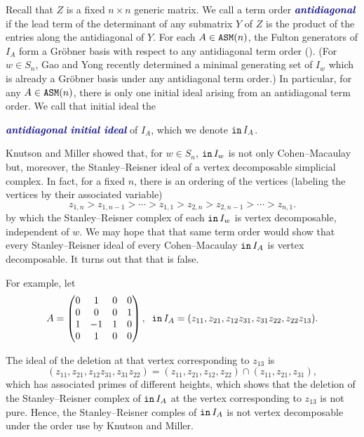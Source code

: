 \documentclass[12 pt]{amsart}
\DeclareMathOperator{\init}{{\tt in}}
\DeclareMathOperator{\asm}{\tt ASM}
\theoremstyle{plain}
\newenvironment{example}
  {\pushQED{\qed}\renewcommand{\qedsymbol}{$\diamondsuit$}\examplex}
  {\popQED\endexamplex}
\theoremstyle{definition}
\theoremstyle{remark}
\newcommand{\newword}[1]{\textcolor{darkblue}{\textbf{\emph{#1}}}}
\begin{document}
Recall that $Z$ is a fixed $n \times n$ generic matrix.  We call a term order \newword{antidiagonal} if the lead term of the determinant of any submatrix $Y$ of $Z$ is the product of the entries along the antidiagonal of $Y$.  For each $A \in \asm(n)$, the Fulton generators of $I_A$ form a Gr\"obner basis with respect to any antidiagonal term order (\cite{KM05, Knu, Wei17}).  (For $w \in S_n$, Gao and Yong \cite{GY24} recently determined a minimal generating set of $I_w$ which is already a Gr\"obner basis under any antidiagonal term order.)  In particular, for any $A \in \asm(n)$, there is only one initial ideal arising from an antidiagonal term order.  We call that initial ideal the {\newword{antidiagonal initial ideal} of $I_A$, which we denote $\init I_A$.  





Knutson and Miller \cite{KM05} showed that, for $w \in S_n$, $\init I_w$ is not only Cohen--Macaulay but, moreover, the Stanley--Reisner ideal of a vertex decomposable simplicial complex.  In fact, for a fixed $n$, there is an ordering of the vertices (labeling the vertices by their associated variable)
\[
    z_{1,n} > z_{1,n-1} > \cdots > z_{1,1} > z_{2,n} > z_{2,n-1} > \cdots > z_{n,1}.
\]
by which the Stanley--Reisner complex of each $\init I_w$ is vertex decomposable, independent of $w$.  We may hope that that same term order would show that every Stanley--Reisner ideal of every Cohen--Macaulay $\init I_A$ is vertex decomposable. It turns out that that is false.

\begin{example}\label{ex:non-KM-gvd}
For example, let
\[
A = \begin{pmatrix} 0&1&0&0\\ 0&0&0&1\\ 1&-1&1&0\\ 0&1&0&0 \end{pmatrix}, \;\; \init I_A = (z_{11},z_{21},z_{12}z_{31},z_{31}z_{22},z_{22}z_{13}).
\]

The ideal of the deletion at that vertex corresponding to $z_{13}$ is
\[
 (z_{11},z_{21},z_{12}z_{31},z_{31}z_{22}) = (z_{11}, z_{21}, z_{12}, z_{22}) \cap (z_{11}, z_{21}, z_{31}),
\]
which has associated primes of different heights, which shows that the deletion of the Stanley--Reisner complex of $\init I_A$ at the vertex corresponding to $z_{13}$ is not pure.  Hence, the Stanley--Reisner comples of $\init I_A$ is not vertex decomposable under the order use by Knutson and Miller.
\end{example}

}
\end{document}
